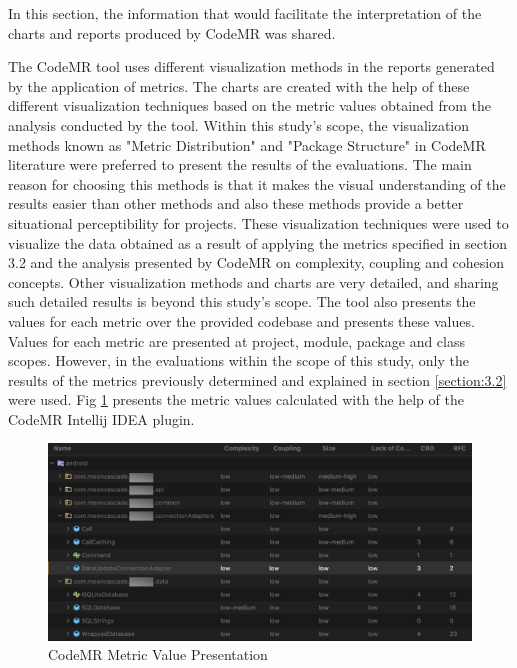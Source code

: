 In this section, the information that would facilitate the interpretation of the charts and reports produced by CodeMR was shared.

The CodeMR tool uses different visualization methods in the reports generated by the application of metrics. The charts are created with the help of these different visualization techniques based on the metric values obtained from the analysis conducted by the tool. Within this study's scope, the visualization methods known as "Metric Distribution" and "Package Structure" in CodeMR literature were preferred to present the results of the evaluations. The main reason for choosing this methods is that it makes the visual understanding of the results easier than other methods and also these methods provide a better situational perceptibility for projects. These visualization techniques were used to visualize the data obtained as a result of applying the metrics specified in section 3.2 and the analysis presented by CodeMR on complexity, coupling and cohesion concepts. Other visualization methods and charts are very detailed, and sharing such detailed results is beyond this study's scope. The tool also presents the values for each metric over the provided codebase and presents these values. Values for each metric are presented at project, module, package and class scopes. However, in the evaluations within the scope of this study, only the results of the metrics previously determined and explained in section \ref{section:3.2} were used. Fig \ref{fig:code-mr-metric-val} presents the metric values calculated with the help of the CodeMR Intellij IDEA plugin.
\begin{figure}[ht!]
    \centering
    \includegraphics[scale=0.35]{figures/code-mr-metric-val.png}
    \caption{CodeMR Metric Value Presentation}
    \label{fig:code-mr-metric-val}
\end{figure}
\FloatBarrier

